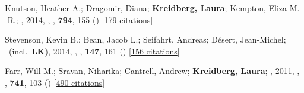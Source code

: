 \item[{\color{numcolor}\scriptsize3}] Knutson, Heather A.; Dragomir, Diana; \textbf{Kreidberg, Laura}; Kempton, Eliza M. -R.; \etal, 2014, , \apj, \textbf{794}, 155 () [\href{https://ui.adsabs.harvard.edu/abs/2014ApJ...794..155K}{179 citations}]

\item[{\color{numcolor}\scriptsize2}] Stevenson, Kevin B.; Bean, Jacob L.; Seifahrt, Andreas; D{\'e}sert, Jean-Michel; \etal\ (incl.\ \textbf{LK}), 2014, , \aj, \textbf{147}, 161 () [\href{https://ui.adsabs.harvard.edu/abs/2014AJ....147..161S}{156 citations}]

\item[{\color{numcolor}\scriptsize1}] Farr, Will M.; Sravan, Niharika; Cantrell, Andrew; \textbf{Kreidberg, Laura}; \etal, 2011, , \apj, \textbf{741}, 103 () [\href{https://ui.adsabs.harvard.edu/abs/2011ApJ...741..103F}{490 citations}]